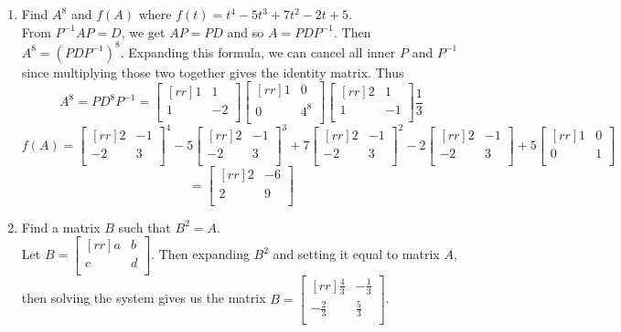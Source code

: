 \documentclass[12pt]{article}
\theoremstyle{definition}
\theoremstyle{plain}
\begin{document}
\begin{enumerate}
\begin{enumerate}
	\item Find $A^8$ and $f(A)$ where $f(t)=t^4-5t^3+7t^2-2t+5$.\\
	From $P^{-1}AP=D$, we get $AP=PD$ and so $A=PDP^{-1}$. Then $A^8=(PDP^{-1})^8$. Expanding this formula, we can cancel all inner $P$ and $P^{-1}$ since multiplying those two together gives the identity matrix. Thus
	\[ A^8=PD^8P^{-1}=\begin{bmatrix}[rr]1&1\\1&-2\\\end{bmatrix}\begin{bmatrix}[rr]1&0\\0&4^8\\\end{bmatrix}\begin{bmatrix}[rr]2&1\\1&-1\\\end{bmatrix}\frac{1}{3} \]
	\[ f(A) = \begin{bmatrix}[rr]2&-1\\-2&3\\\end{bmatrix}^4-5\begin{bmatrix}[rr]2&-1\\-2&3\\\end{bmatrix}^3+7\begin{bmatrix}[rr]2&-1\\-2&3\\\end{bmatrix}^2-2\begin{bmatrix}[rr]2&-1\\-2&3\\\end{bmatrix}+5\begin{bmatrix}[rr]1&0\\0&1\\\end{bmatrix} \]
	\[ = \begin{bmatrix}[rr]2&-6\\2&9\\\end{bmatrix} \]
	\item Find a matrix $B$ such that $B^2=A$.\\
	Let $B=\begin{bmatrix}[rr]a&b\\c&d\\\end{bmatrix}$. Then expanding $B^2$ and setting it equal to matrix $A$, then solving the system gives us the matrix $B=\begin{bmatrix}[rr]\frac{4}{3}&-\frac{1}{3}\\-\frac{2}{3}&\frac{5}{3}\\\end{bmatrix}$.
	

\end{enumerate}
\end{enumerate}
\end{document}
